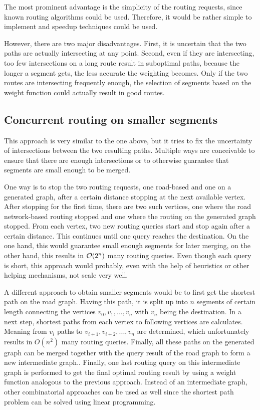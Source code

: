 		The most prominent advantage is the simplicity of the routing requests, since known routing algorithms could be used.
		Therefore, it would be rather simple to implement and speedup techniques could be used.
		
		However, there are two major disadvantages.
		First, it is uncertain that the two paths are actually intersecting at any point.
		Second, even if they are intersecting, too few intersections on a long route result in suboptimal paths, because the longer a segment gets, the less accurate the weighting becomes.
		Only if the two routes are intersecting frequently enough, the selection of segments based on the weight function could actually result in good routes.
	
	\subsection{Concurrent routing on smaller segments}
	
		This approach is very similar to the one above, but it tries to fix the uncertainty of intersections between the two resulting paths.
		Multiple ways are conceivable to ensure that there are enough intersections or to otherwise guarantee that segments are small enough to be merged.
		
		One way is to stop the two routing requests, one road-based and one on a generated graph, after a certain distance stopping at the next available vertex.
		After stopping for the first time, there are two such vertices, one where the road network-based routing stopped and one where the routing on the generated graph stopped.
		From each vertex, two new routing queries start and stop again after a certain distance.
		This continues until one query reaches the destination.
		On the one hand, this would guarantee small enough segments for later merging, on the other hand, this results in $\mathcal{O}(2^n)$ many routing queries.
		Even though each query is short, this approach would probably, even with the help of heuristics or other helping mechanisms, not scale very well.
		
		A different approach to obtain smaller segments would be to first get the shortest path on the road graph.
		Having this path, it is split up into $n$ segments of certain length connecting the vertices $v_0, v_1, ..., v_n$ with $v_n$ being the destination.
		In a next step, shortest paths from each vertex to following vertices are calculates.
		Meaning from $v_i$ paths to $v_{i+1}, v_{i+2}, ..., v_n$ are determined, which unfortunately results in $O(n^2)$ many routing queries.
		Finally, all these paths on the generated graph can be merged together with the query result of the road graph to form a new intermediate graph..
		Finally, one last routing query on this intermediate graph is performed to get the final optimal routing result by using a weight function analogous to the previous approach.
		Instead of an intermediate graph, other combinatorial approaches can be used as well since the shortest path problem can be solved using linear programming\cite{handler-zang-lp-duality}.
		
